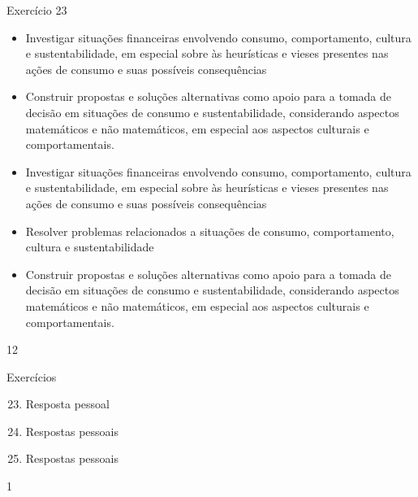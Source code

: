 \begin{objectives}{Exercício 23}
{
  \begin{itemize}
  \item Investigar situações financeiras envolvendo consumo, comportamento, cultura e sustentabilidade, em especial sobre às heurísticas e vieses presentes nas ações de consumo e suas possíveis consequências
  \item Construir propostas e soluções alternativas como apoio para a tomada de decisão em situações de consumo e sustentabilidade, considerando aspectos matemáticos e não matemáticos, em especial aos aspectos culturais e comportamentais.
  \end{itemize}

  \begin{itemize}
  \item Investigar situações financeiras envolvendo consumo, comportamento, cultura e sustentabilidade, em especial sobre às heurísticas e vieses presentes nas ações de consumo e suas possíveis consequências
  \item Resolver problemas relacionados a situações de consumo, comportamento, cultura e sustentabilidade
  \item Construir propostas e soluções alternativas como apoio para a tomada de decisão em situações de consumo e sustentabilidade, considerando aspectos matemáticos e não matemáticos, em especial aos aspectos culturais e comportamentais.
  \end{itemize}
}{1}{2}
\end{objectives}
\begin{answer}{Exercícios}
{\exerciselist

  \begin{enumerate}\setcounter{enumi}{22}
    \item Resposta pessoal
    \item Respostas pessoais
    \item Respostas pessoais
  \end{enumerate}
}{1}
\end{answer}
\clearmargin

